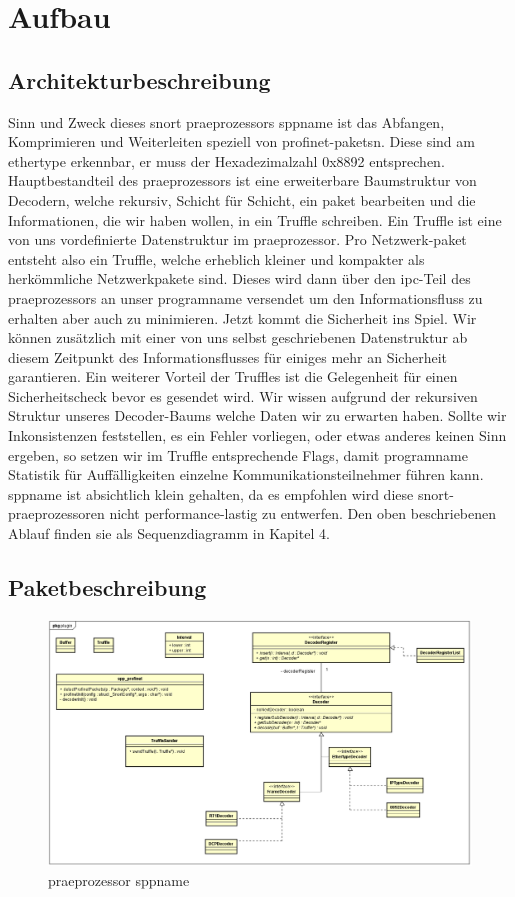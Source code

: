 \chapter{Aufbau \sppname}

\section{Architekturbeschreibung}

Sinn und Zweck dieses \gls{snort} \gls{praeprozessor}s \gls{sppname} ist das Abfangen,
Komprimieren und Weiterleiten speziell von \gls{profinet}-\glspl{paket}n. Diese
sind am \gls{ethertype} erkennbar, er muss der Hexadezimalzahl 0x8892 entsprechen.
Hauptbestandteil des \gls{praeprozessor}s ist eine erweiterbare Baumstruktur von Decodern, welche rekursiv, Schicht für Schicht, ein \gls{paket} bearbeiten und die Informationen, die wir haben wollen, in ein Truffle schreiben. Ein Truffle ist eine von uns vordefinierte Datenstruktur im \gls{praeprozessor}.
Pro Netzwerk-\gls{paket} entsteht also ein Truffle, welche erheblich kleiner und kompakter als herkömmliche Netzwerkpakete sind. Dieses wird dann über den \gls{ipc}-Teil des \gls{praeprozessor}s
an unser \gls{programname} versendet um den Informationsfluss zu erhalten aber auch zu minimieren.\newline
Jetzt kommt die Sicherheit ins Spiel. Wir können zusätzlich mit einer von uns selbst geschriebenen Datenstruktur ab diesem Zeitpunkt des Informationsflusses für einiges mehr an Sicherheit garantieren.
Ein weiterer Vorteil der Truffles ist die Gelegenheit für einen Sicherheitscheck bevor es gesendet wird. Wir wissen aufgrund der rekursiven Struktur unseres Decoder-Baums welche Daten wir zu erwarten haben. Sollte wir Inkonsistenzen feststellen, es ein Fehler vorliegen, oder etwas anderes keinen Sinn ergeben, so setzen wir im Truffle entsprechende Flags, damit \gls{programname} Statistik für Auffälligkeiten einzelne Kommunikationsteilnehmer führen kann.\newline
\gls{sppname} ist absichtlich klein gehalten, da es empfohlen wird diese \gls{snort}-\gls{praeprozessor}en nicht performance-lastig zu entwerfen. Den oben beschriebenen Ablauf finden sie als Sequenzdiagramm in Kapitel 4. 


\section{Paketbeschreibung}


\begin{figure}[H]
  \centering
  \includegraphics[width=\textwidth]{../diagramimages/spp_profinet.png}
  \caption{\gls{praeprozessor} \gls{sppname}}
\end{figure}

